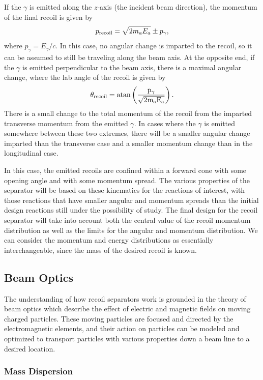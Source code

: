 If the $\gamma$ is emitted along the $z$-axis (the incident beam direction),
the momentum of the final recoil is given by
\[
    p_{\rm{recoil}} = \sqrt{2m_aE_a} \pm p_{\gamma},
\]
where $p_{\gamma} = E_{\gamma}/c$. In this case, no angular change is imparted
to the recoil, so it can be assumed to still be traveling along the beam axis.
At the opposite end, if the $\gamma$ is emitted perpendicular to the beam axis,
there is a maximal angular change, where the lab angle of the recoil is
given by
\[
    \theta_{\rm{recoil}} = \rm{atan}\left(\frac{p_{\gamma}}{\sqrt{2m_aE_a}}\right).
\]
There is a small change to the total momentum of the recoil from the imparted
transverse momentum from the emitted $\gamma$. In cases where the $\gamma$ is
emitted somewhere between these two extremes, there will be a smaller angular
change imparted than the transverse case and a smaller momentum change than in
the longitudinal case.

In this case, the emitted recoils are confined within a forward cone with
some opening angle and with some momentum spread. The various properties of
the separator will be based on these kinematics for the reactions of interest,
with those reactions that have smaller angular and momentum spreads than the
initial design reactions still under the possibility of study. The final design
for the recoil separator will take into account both the central value of the
recoil momentum distribution as well as the limits for the angular and momentum
distribution. We can consider the momentum and energy distributions as
essentially interchangeable, since the mass of the desired recoil is known.


\subsection{Beam Optics}

The understanding of how recoil separators work is grounded in the theory of
beam optics which describe the effect of electric and magnetic fields on moving
charged particles. These moving particles are focused and directed by the
electromagnetic elements, and their action on particles can be modeled and
optimized to transport particles with various properties down a beam line to a
desired location.

\subsubsection{Mass Dispersion}

